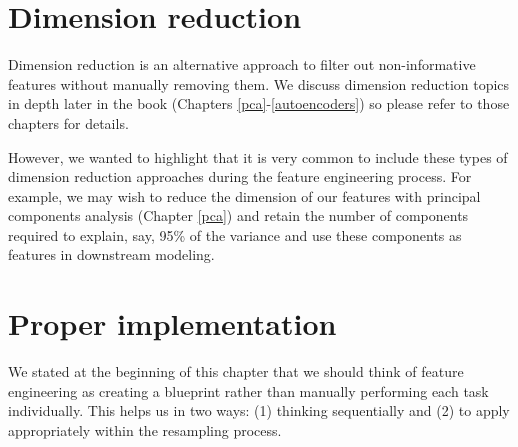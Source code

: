 \documentclass[]{krantz}
\makeatletter
\newenvironment{Shaded}{\begin{snugshade}}{\end{snugshade}}
\newcommand{\CommentTok}[1]{\textcolor[rgb]{0.37,0.37,0.37}{\textit{#1}}}
\newcommand{\DataTypeTok}[1]{\textcolor[rgb]{0.27,0.27,0.27}{#1}}
\newcommand{\FloatTok}[1]{\textcolor[rgb]{0.06,0.06,0.06}{#1}}
\newcommand{\KeywordTok}[1]{\textcolor[rgb]{0.27,0.27,0.27}{\textbf{#1}}}
\newcommand{\NormalTok}[1]{#1}
\newcommand{\OperatorTok}[1]{\textcolor[rgb]{0.43,0.43,0.43}{\textbf{#1}}}
\newcommand{\StringTok}[1]{\textcolor[rgb]{0.5,0.5,0.5}{#1}}
\newenvironment{kframe}{%
\medskip{}
\setlength{\fboxsep}{.8em}
 \def\at@end@of@kframe{}%
 \ifinner\ifhmode%
  \def\at@end@of@kframe{\end{minipage}}%
  \begin{minipage}{\columnwidth}%
 \fi\fi%
 \def\FrameCommand##1{\hskip\@totalleftmargin \hskip-\fboxsep
 \colorbox{shadecolor}{##1}\hskip-\fboxsep
     \hskip-\linewidth \hskip-\@totalleftmargin \hskip\columnwidth}%
 \MakeFramed {\advance\hsize-\width
   \@totalleftmargin\z@ \linewidth\hsize
   \@setminipage}}%
 {\par\unskip\endMakeFramed%
 \at@end@of@kframe}
\renewenvironment{Shaded}{\begin{kframe}}{\end{kframe}}
\makeatother
\begin{document}
\hypertarget{feature-reduction}{%
\section{Dimension reduction}\label{feature-reduction}}

Dimension reduction is an alternative approach to filter out non-informative features without manually removing them. We discuss dimension reduction topics in depth later in the book (Chapters \ref{pca}-\ref{autoencoders}) so please refer to those chapters for details.

However, we wanted to highlight that it is very common to include these types of dimension reduction approaches during the feature engineering process. For example, we may wish to reduce the dimension of our features with principal components analysis (Chapter \ref{pca}) and retain the number of components required to explain, say, 95\% of the variance and use these components as features in downstream modeling.

\begin{Shaded}
\end{Shaded}

\hypertarget{proper-implementation}{%
\section{Proper implementation}\label{proper-implementation}}

We stated at the beginning of this chapter that we should think of feature engineering as creating a blueprint rather than manually performing each task individually. This helps us in two ways: (1) thinking sequentially and (2) to apply appropriately within the resampling process.
\end{document}
